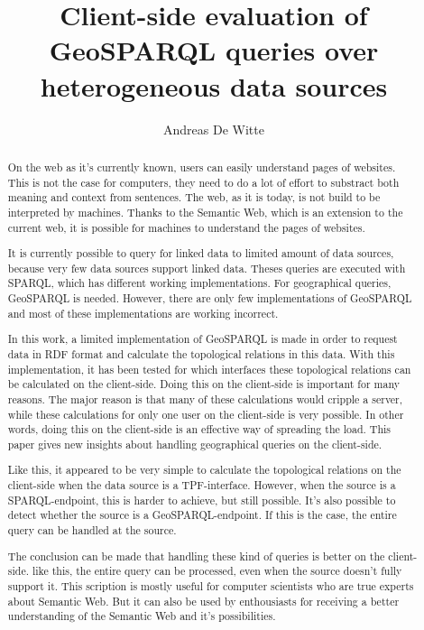 \documentclass[twocolumn]{phdsymp} %
\begin{document}
\title{Client-side evaluation of GeoSPARQL queries over heterogeneous data sources} %

\author{Andreas De Witte}


\maketitle

\begin{abstract}
    On the web as it's currently known, users can easily understand pages of websites. This is not the case for computers, they need to do a lot of effort to substract both meaning and context from sentences. The web, as it is today, is not build to be interpreted by machines. Thanks to the Semantic Web, which is an extension to the current web, it is possible for machines to understand the pages of websites.

    It is currently possible to query for linked data to limited amount of data sources, because very few data sources support linked data. Theses queries are executed with SPARQL, which has different working implementations. For geographical queries, GeoSPARQL is needed. However, there are only few implementations of GeoSPARQL and most of these implementations are working incorrect.

    In this work, a limited implementation of GeoSPARQL is made in order to request data in RDF format and calculate the topological relations in this data. With this implementation, it has been tested for which interfaces these topological relations can be calculated on the client-side. Doing this on the client-side is important for many reasons. The major reason is that many of these calculations would cripple a server, while these calculations for only one user on the client-side is very possible. In other words, doing this on the client-side is an effective way of spreading the load. This paper gives new insights about handling geographical queries on the client-side.

    Like this, it appeared to be very simple to calculate the topological relations on the client-side when the data source is a TPF-interface. However, when the source is a SPARQL-endpoint, this is harder to achieve, but still possible. It's also possible to detect whether the source is a GeoSPARQL-endpoint. If this is the case, the entire query can be handled at the source.
    
    The conclusion can be made that handling these kind of queries is better on the client-side. like this, the entire query can be processed, even when the source doesn't fully support it. This scription is mostly useful for computer scientists who are true experts about Semantic Web. But it can also be used by enthousiasts for receiving a better understanding of the Semantic Web and it's possibilities.
\end{abstract}
\end{document}
